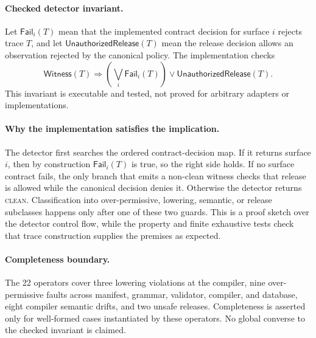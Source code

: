 \paragraph{Checked detector invariant.}
Let $\mathsf{Fail}_i(T)$ mean that the implemented contract decision for surface $i$ rejects trace $T$, and let $\mathsf{UnauthorizedRelease}(T)$ mean the release decision allows an observation rejected by the canonical policy. The implementation checks
\[
\mathsf{Witness}(T)\Rightarrow
\left(\bigvee_i\mathsf{Fail}_i(T)\right)
\vee \mathsf{UnauthorizedRelease}(T).
\]
This invariant is executable and tested, not proved for arbitrary adapters or implementations.

\paragraph{Why the implementation satisfies the implication.}
The detector first searches the ordered contract-decision map. If it returns surface $i$, then by construction $\mathsf{Fail}_i(T)$ is true, so the right side holds. If no surface contract fails, the only branch that emits a non-clean witness checks that release is allowed while the canonical decision denies it. Otherwise the detector returns \textsc{clean}. Classification into over-permissive, lowering, semantic, or release subclasses happens only after one of these two guards. This is a proof sketch over the detector control flow, while the property and finite exhaustive tests check that trace construction supplies the premises as expected.

\paragraph{Completeness boundary.}
The 22 operators cover three lowering violations at the compiler, nine over-permissive faults across manifest, grammar, validator, compiler, and database, eight compiler semantic drifts, and two unsafe releases. Completeness is asserted only for well-formed cases instantiated by these operators. No global converse to the checked invariant is claimed.
